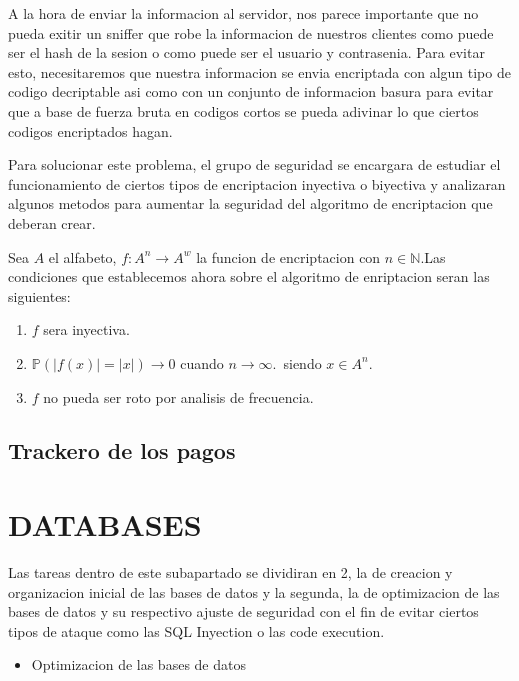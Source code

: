 \documentclass{article}
\theoremstyle{definition}
\begin{document}
A la hora de enviar la informacion al servidor, nos parece importante que no pueda exitir un sniffer que robe la informacion de nuestros clientes como puede ser el hash de la sesion o como puede ser el usuario y contrasenia. Para evitar esto, necesitaremos que nuestra informacion se envia encriptada con algun tipo de codigo decriptable asi como con un conjunto de informacion basura para evitar que a base de fuerza bruta en codigos cortos se pueda adivinar lo que ciertos codigos encriptados hagan.

Para solucionar este problema, el grupo de seguridad se encargara de estudiar el funcionamiento de ciertos tipos de encriptacion inyectiva o biyectiva y analizaran algunos metodos para aumentar la seguridad del algoritmo de encriptacion que deberan crear.

Sea $A$ el alfabeto, $f : A^n \to A^w$ la funcion de encriptacion con $n \in \mathbb{N}$.Las condiciones que establecemos ahora sobre el algoritmo de enriptacion seran las siguientes:

\begin{enumerate}
    \item $f$ sera inyectiva.
    \item $\mathbb{P}\left(|f(x)|=|x|\right) \to 0$ cuando $n \to \infty$.\, siendo $x \in A^n$.
    \item $f$ no pueda ser roto por analisis de frecuencia.
\end{enumerate}

\subsection{Trackero de los pagos}

\section{DATABASES}


Las tareas dentro de este subapartado se dividiran en 2, la de creacion y organizacion inicial de las bases de datos y la segunda, la de optimizacion de las bases de datos y su respectivo ajuste de seguridad con el fin de evitar ciertos tipos de ataque como las SQL Inyection o las code execution.


\begin{itemize}
    \item Optimizacion de las bases de datos
\end{itemize}
\end{document}

